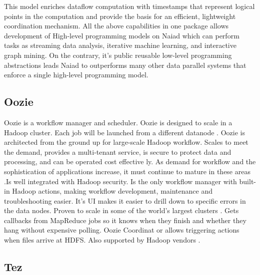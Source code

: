     This model enriches dataflow computation with timestamps that
    represent logical points in the computation and provide the basis
    for an efficient, lightweight coordination mechanism.  All the
    above capabilities in one package allows development of High-level
    programming models on Naiad which can perform tasks as streaming
    data analysis, iterative machine learning, and interactive graph
    mining. On the contrary, it's public reusable low-level
    programming abstractions leads Naiad to outperforms many other
    data parallel systems that enforce a single high-level programming
    model.

    \pv
    
\subsection{Oozie}

Oozie is a workflow manager and scheduler. Oozie is designed to scale
in a Hadoop cluster. Each job will be launched from a different
datanode \cite{paper-Oozie} \cite{www-Oozie1}.  Oozie
\cite{www-Oozie2} is architected from the ground up for large-scale
Hadoop workflow. Scales to meet the demand, provides a multi-tenant
service, is secure to protect data and processing, and can be operated
cost effective ly. As demand for workflow and the sophistication of
applications increase, it must continue to mature in these areas
\cite{paper-Oozie}.Is well integrated with Hadoop security. Is the
only workflow manager with built-in Hadoop actions, making workflow
development, maintenance and troubleshooting easier. It’s UI makes it
easier to drill down to specific errors in the data nodes. Proven to
scale in some of the world’s largest clusters \cite{paper-Oozie}. Gets
callbacks from MapReduce jobs so it knows when they finish and whether
they hang without expensive polling. Oozie Coordinat or allows
triggering actions when files arrive at HDFS. Also supported by Hadoop
vendors \cite{paper-Oozie}.


\pv

\subsection{Tez}

